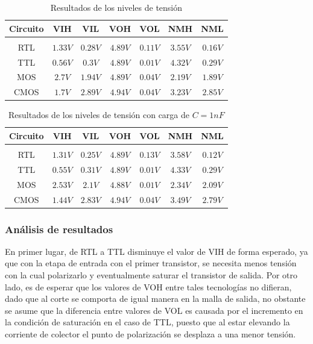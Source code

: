 \begin{table}[H]
    \centering
    \begin{tabular}{c c c c c c c}
        Circuito & VIH & VIL & VOH & VOL & NMH & NML \\
        \hline \\
        RTL & $1.33V$ & $0.28V$ & $4.89V$ & $0.11V$ & $3.55V$ & $0.16V$ \\
        TTL & $0.56V$ & $0.3V$ & $4.89V$ & $0.01V$ & $4.32V$ & $0.29V$ \\
        MOS & $2.7V$ & $1.94V$ & $4.89V$ & $0.04V$ & $2.19V$ & $1.89V$ \\
        CMOS & $1.7V$ & $2.89V$ & $4.94V$ & $0.04V$ & $3.23V$ & $2.85V$ \\
        \hline
    \end{tabular} 
    \caption{Resultados de los niveles de tensi\'on}
\end{table}

\begin{table}[H]
    \centering
    \begin{tabular}{c c c c c c c}
        Circuito & VIH & VIL & VOH & VOL & NMH & NML \\
        \hline \\
        RTL & $1.31V$ & $0.25V$ & $4.89V$ & $0.13V$ & $3.58V$ & $0.12V$ \\
        TTL & $0.55V$ & $0.31V$ & $4.89V$ & $0.01V$ & $4.33V$ & $0.29V$ \\
        MOS & $2.53V$ & $2.1V$ & $4.88V$ & $0.01V$ & $2.34V$ & $2.09V$ \\
        CMOS & $1.44V$ & $2.83V$ & $4.94V$ & $0.04V$ & $3.49V$ & $2.79V$ \\
        \hline
    \end{tabular} 
    \caption{Resultados de los niveles de tensi\'on con carga de $C = 1nF$}
    \label{table:voltage_levels_charged}
\end{table}

\subsubsection{An\'alisis de resultados}
En primer lugar, de RTL a TTL disminuye el valor de VIH de forma esperado, ya que con la etapa de entrada con el primer transistor, se necesita menos tensi\'on
con la cual polarizarlo y eventualmente saturar el transistor de salida. Por otro lado, es de esperar que los valores de VOH entre tales tecnolog\'ias no difieran,
dado que al corte se comporta de igual manera en la malla de salida, no obstante se asume que la diferencia entre valores de VOL es causada por el incremento en la condici\'on
de saturaci\'on en el caso de TTL, puesto que al estar elevando la corriente de colector el punto de polarizaci\'on se desplaza a una menor tensi\'on.

